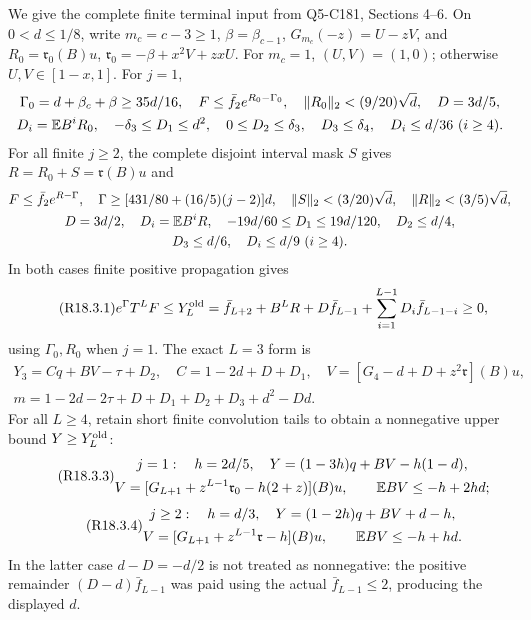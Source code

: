 We give the complete finite terminal input from Q5-C181, Sections
4--6. On $0<d\le1/8$, write
$m_c=c-3\ge1$, $\beta=\beta_{c-1}$,
$G_{m_c}(-z)=U-zV$, and
$R_0=\mathfrak r_0(B)u$,
$\mathfrak r_0=-\beta+x^2V+zxU$.
For $m_c=1$, $(U,V)=(1,0)$; otherwise $U,V\in[1-x,1]$.
For $j=1$,
\[
\begin{gathered}
\Gamma_0=d+\beta_c+\beta\ge35d/16,\quad
F\le\bar f_2e^{R_0-\Gamma_0},\quad\|R_0\|_2<(9/20)\sqrt d,
\quad D=3d/5,\\
D_i=\mathbb E B^iR_0,\quad -\delta_3\le D_1\le d^2,
\quad0\le D_2\le\delta_3,\quad D_3\le\delta_4,
\quad D_i\le d/36\ (i\ge4).
\end{gathered}
\]
For all finite $j\ge2$, the complete disjoint interval mask $S$ gives
$R=R_0+S=\mathfrak r(B)u$ and
\[
\begin{gathered}
F\le\bar f_2e^{R-\Gamma},\quad
\Gamma\ge[431/80+(16/5)(j-2)]d,\quad
\|S\|_2<(3/20)\sqrt d,\quad\|R\|_2<(3/5)\sqrt d,\\
D=3d/2,\quad D_i=\mathbb E B^iR,\quad
-19d/60\le D_1\le19d/120,\quad D_2\le d/4,\\
D_3\le d/6,\quad D_i\le d/9\ (i\ge4).
\end{gathered}
\]
In both cases finite positive propagation gives
\begin{equation}\tag{R18.3.1}\label{eq:R18:old}
e^\Gamma T^LF\le Y_L^{\rm old}
=\bar f_{L+2}+B^LR+D\bar f_{L-1}
+\sum_{i=1}^{L-1}D_i\bar f_{L-1-i}\ge0,
\end{equation}
using $\Gamma_0,R_0$ when $j=1$. The exact $L=3$ form is
\begin{equation}\tag{R18.3.2}\label{eq:R18:three}
\begin{gathered}
Y_3=Cq+BV-\tau+D_2,\quad C=1-2d+D+D_1,\quad
V=[G_4-d+D+z^2\mathfrak r](B)u,\\
m=1-2d-2\tau+D+D_1+D_2+D_3+d^2-Dd.
\end{gathered}
\end{equation}
For all $L\ge4$, retain short finite convolution tails to obtain a
nonnegative upper bound $Y\ge Y_L^{\rm old}$:
\begin{equation}\tag{R18.3.3}\label{eq:R18:longsingle}
\begin{gathered}
j=1:\quad h=2d/5,\quad
Y=(1-3h)q+BV-h(1-d),\\
V=[G_{L+1}+z^{L-1}\mathfrak r_0-h(2+z)](B)u,
\qquad\mathbb E BV\le-h+2hd;
\end{gathered}
\end{equation}
\begin{equation}\tag{R18.3.4}\label{eq:R18:longmulti}
\begin{gathered}
j\ge2:\quad h=d/3,\quad
Y=(1-2h)q+BV+d-h,\\
V=[G_{L+1}+z^{L-1}\mathfrak r-h](B)u,
\qquad\mathbb E BV\le-h+hd.
\end{gathered}
\end{equation}
In the latter case $d-D=-d/2$ is not treated as nonnegative: the
positive remainder $(D-d)\bar f_{L-1}$ was paid using the actual
$\bar f_{L-1}\le2$, producing the displayed $d$.

